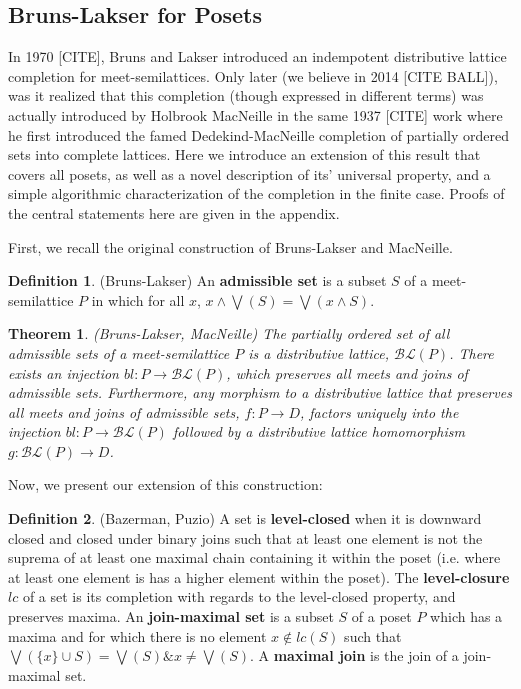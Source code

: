 \documentclass[hoptionsi,review,format=acmsmall]{acmart}
\newtheorem{theorem}{Theorem}[section]
\theoremstyle{definition}
\newtheorem{definition}{Definition}[section]
\newcommand{\BLc}{\mathcal{BL}}
\newcommand{\band}{\mathbin{\&}}
\begin{document}
\subsection{Bruns-Lakser for Posets}

In 1970 [CITE], Bruns and Lakser introduced an indempotent distributive lattice completion for meet-semilattices. Only later (we believe in 2014 [CITE BALL]), was it realized that this completion (though expressed in different terms) was actually introduced by  Holbrook MacNeille in the same 1937 [CITE] work where he first introduced the famed Dedekind-MacNeille completion of partially ordered sets into complete lattices. Here we introduce an extension of this result that covers all posets, as well as a novel description of its' universal property, and a simple algorithmic characterization of the completion in the finite case. Proofs of the central statements here are given in the appendix.

First, we recall the original construction of Bruns-Lakser and MacNeille.

\begin{definition}
(Bruns-Lakser) An \textbf{admissible set} is a subset \(S\) of a meet-semilattice \(P\) in which for all \(x\), \(x \wedge \bigvee(S) = \bigvee(x \wedge S)\).
\end{definition}

\begin{theorem}
(Bruns-Lakser, MacNeille) The partially ordered set of all admissible sets of a meet-semilattice \(P\) is a distributive lattice, \(\BLc(P)\). There exists an injection \(bl : P \rightarrow \BLc(P)\), which preserves all meets and joins of admissible sets. Furthermore, any morphism to a distributive lattice that preserves all meets and joins of admissible sets, \(f : P \rightarrow D\), factors uniquely into the injection \(bl : P \rightarrow \BLc(P)\) followed by a distributive lattice homomorphism \(g : \BLc(P) \rightarrow D\).
\end{theorem}

Now, we present our extension of this construction:

\begin{definition}
(Bazerman, Puzio) A set is \textbf{level-closed} when it is downward closed and closed under binary joins such that at least one element is not the suprema of at least one maximal chain containing it within the poset (i.e. where at least one element is has a higher element within the poset). The \textbf{level-closure} \(lc\) of a set is its completion with regards to the level-closed property, and preserves maxima. An \textbf{join-maximal set} is a subset \(S\) of a poset \(P\) which has a maxima and for which there is no element \(x \notin lc(S)\) such that \(\bigvee(\{x\} \cup S) = \bigvee(S) \band x \neq \bigvee(S)\). A \textbf{maximal join} is the join of a join-maximal set.
\end{definition}
\end{document}

